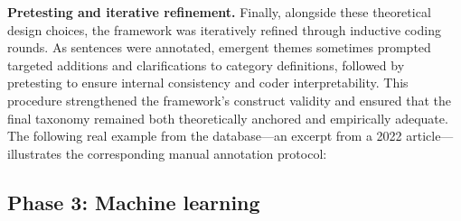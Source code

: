 \documentclass[12pt]{article}
\renewcommand\_{\texttt{\detokenize{_}\allowbreak}}
\begin{document}
{\bfseries{Pretesting and iterative refinement.}} Finally, alongside these theoretical design choices, the framework was iteratively refined through inductive coding rounds. As sentences were annotated, emergent themes sometimes prompted targeted additions and clarifications to category definitions, followed by pretesting to ensure internal consistency and coder interpretability. This procedure strengthened the framework's construct validity and ensured that the final taxonomy remained both theoretically anchored and empirically adequate. The following real example from the database---an excerpt from a 2022 article---illustrates the corresponding manual annotation protocol:

\begin{center}
\end{center}

\subsection{Phase 3: Machine learning}
\end{document}
